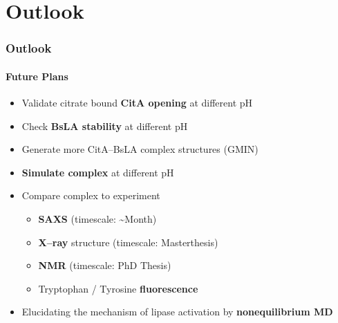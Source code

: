 \documentclass[english]{beamer}
\begin{document}

\section{Outlook}

\begin{frame}
    \frametitle{Outlook}
    \framesubtitle{Future Plans}

    \begin{itemize}
        \item Validate citrate bound \textbf{CitA opening} at different pH
        \item Check \textbf{BsLA stability} at different pH
        \item Generate more CitA--BsLA complex structures (GMIN)
        \item \textbf{Simulate complex} at different pH

        \pause

        \item Compare complex to experiment
            \begin{itemize}
                \item \textbf{SAXS} (timescale: \textasciitilde Month)
                \item \textbf{X--ray} structure (timescale: Masterthesis)
                \item \textbf{NMR} (timescale: PhD Thesis)
                \item Tryptophan / Tyrosine \textbf{fluorescence}
            \end{itemize}

        \pause

    \item Elucidating the mechanism of lipase activation by \textbf{nonequilibrium MD}
    \end{itemize}
\end{frame}   
 
\end{document}
